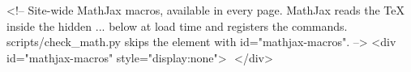 <!-- Site-wide MathJax macros, available in every page. MathJax reads the TeX
     inside the hidden \(...\) below at load time and registers the commands.
     scripts/check_math.py skips the element with id="mathjax-macros". -->
<div id="mathjax-macros" style="display:none">
\(
  \newcommand{\R}{\mathbb{R}}
  \newcommand{\E}{\mathbb{E}}
  \newcommand{\KL}[2]{D_{\mathrm{KL}}\!\left(#1 \,\middle\|\, #2\right)}
  \newcommand{\argmin}{\operatorname*{arg\,min}}
  \newcommand{\ind}{\mathbf{1}}
\)
</div>
